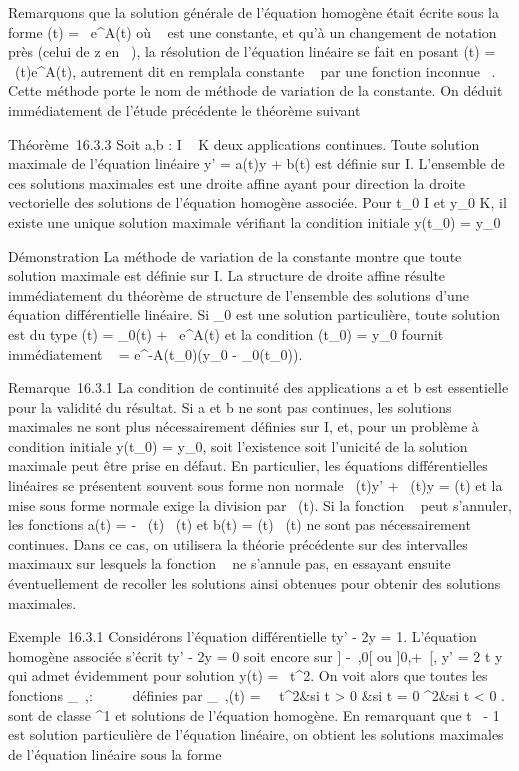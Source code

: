 \documentclass[]{article}
\begin{document}
Remarquons que la solution générale de l'équation homogène était écrite
sous la forme \phi(t) = \lambda~e^A(t) où \lambda~ est une constante, et qu'à
un changement de notation près (celui de z en \lambda~), la résolution de
l'équation linéaire se fait en posant \phi(t) = \lambda~(t)e^A(t),
autrement dit en rempla\ccant la constante \lambda~ par une
fonction inconnue \lambda~. Cette méthode porte le nom de méthode de variation
de la constante. On déduit immédiatement de l'étude précédente le
théorème suivant

Théorème~16.3.3 Soit a,b : I \rightarrow~ K deux applications continues. Toute
solution maximale de l'équation linéaire y' = a(t)y + b(t) est définie
sur I. L'ensemble de ces solutions maximales est une droite affine ayant
pour direction la droite vectorielle des solutions de l'équation
homogène associée. Pour t\_0 \in I et y\_0 \in K, il existe
une unique solution maximale vérifiant la condition initiale
y(t\_0) = y\_0

Démonstration La méthode de variation de la constante montre que toute
solution maximale est définie sur I. La structure de droite affine
résulte immédiatement du théorème de structure de l'ensemble des
solutions d'une équation différentielle linéaire. Si \phi\_0 est
une solution particulière, toute solution est du type \phi(t) =
\phi\_0(t) + \lambda~e^A(t) et la condition \phi(t\_0) =
y\_0 fournit immédiatement \lambda~ =
e^-A(t\_0)(y\_0 -
\phi\_0(t\_0)).

Remarque~16.3.1 La condition de continuité des applications a et b est
essentielle pour la validité du résultat. Si a et b ne sont pas
continues, les solutions maximales ne sont plus nécessairement définies
sur I, et, pour un problème à condition initiale y(t\_0) =
y\_0, soit l'existence soit l'unicité de la solution maximale
peut être prise en défaut. En particulier, les équations différentielles
linéaires se présentent souvent sous forme non normale \alpha~(t)y' + \beta~(t)y =
\gamma(t) et la mise sous forme normale exige la division par \alpha~(t). Si la
fonction \alpha~ peut s'annuler, les fonctions a(t) = - \beta~(t)
\over \alpha~(t) et b(t) = \gamma(t) \over \alpha~(t)
ne sont pas nécessairement continues. Dans ce cas, on utilisera la
théorie précédente sur des intervalles maximaux sur lesquels la fonction
\alpha~ ne s'annule pas, en essayant ensuite éventuellement de recoller les
solutions ainsi obtenues pour obtenir des solutions maximales.

Exemple~16.3.1 Considérons l'équation différentielle ty' - 2y = 1.
L'équation homogène associée s'écrit ty' - 2y = 0 soit encore sur {]}
-\infty~,0{[} ou {]}0,+\infty~{[}, y' = 2 \over t y qui admet
évidemment pour solution y(t) = \lambda~t^2. On voit alors que
toutes les fonctions \phi\_\lambda~,\mu : ~ \rightarrow~ ~ définies par
\phi\_\lambda~,\mu(t) = \left \
\cases \lambda~t^2&si t \textgreater{} 0
 &si t = 0 \cr \mut^2&si t
\textless{} 0  \right . sont de classe ^1
et solutions de l'équation homogène. En remarquant que
t\mapsto~ - 1  est
solution particulière de l'équation linéaire, on obtient les solutions
maximales de l'équation linéaire sous la forme
\end{document}
